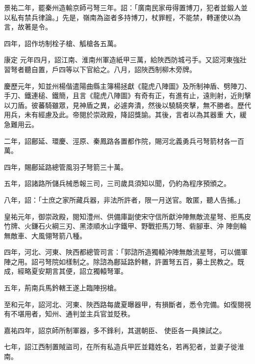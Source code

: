 \begin{pinyinscope}
 景祐二年，罷秦州造輸京師弓弩三年。詔：「廣南民家毋得置博刀，犯者並鍛人並以私有禁兵律論。」先是，嶺南為盜者多持博刀，杖罪輕，不能禁，轉運使以為言，故著是令。



 四年，詔作坊制栓子槍、觚槍各五萬。



 康定
 元年四月，詔江南、淮南州軍造紙甲三萬，給陜西防城弓手。又詔河東強壯習弩者聽自置，戶四等以下官給之。八月，詔陜西制柳木旁牌。



 慶歷元年，知並州楊偕遣陽曲縣主簿楊拯獻《龍虎八陣圖》及所制神盾、劈陣刀、手刀、鐵連槌、鐵簡，且言《龍虎八陣圖》有奇有正，有進有止，遠則射，近則擊以刀盾。彼蕃騎雖眾，見神盾之異，必遽奔潰，然後以驍騎夾擊，無不勝者。歷代用兵，未有經慮及此。帝閱於崇政殿，降詔獎諭。其後，言者以為其器重
 大，緩急難用云。



 二年，詔鄜延、環慶、涇原、秦鳳路各置都作院，賜河北義勇兵弓弩箭材各一百萬。



 四年，賜鄜延路總管風羽子弩箭三十萬。



 五年，詔諸路所儲兵械悉報三司，三司歲具須知以聞，仍約為程序預頒之。



 八年，詔：「士庶之家所藏兵器，非法所許者，限一月送官。敢匿，聽人告捕。」



 皇祐元年，御崇政殿，閱知澧州、供備庫副使宋守信所獻沖陣無敵流星弩、拒馬皮竹牌、火鎌石火綱三刃、黑漆順水山字鐵甲、野戰拒馬刀弩、砦腳車、沖
 陣劍輪無敵車、大風翎弩箭八種。



 四年，河北、河東、陜西都總管司言：「郭諮所造獨轅沖陣無敵流星弩，可以備軍陣之用。詔弓弩院如樣制之。除諮為鄜延路鈐轄，許置弩五百，募土民教之。既成，經略夏安期言其便，詔立獨轅弩軍。



 五年，荊南兵馬鈐轄王遂上臨陣拐槍。



 至和元年，詔河北、河東、陜西路每歲夏曝器甲，有損斷者，悉令完備。如復閱視有不堪用者，知州、通判並主兵官並貶秩。



 嘉祐四年，詔京師所制軍器，多不鋒利，其選朝臣、
 使臣各一員揀試之。



 七年，詔江西制置賊盜司，在所有私造兵甲匠並籍姓名，若再犯者，並妻子徙淮南。




\end{pinyinscope}
